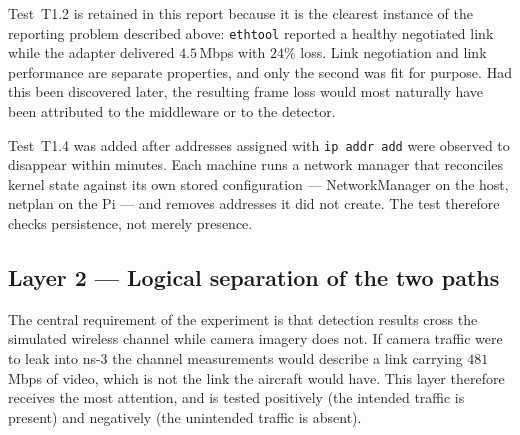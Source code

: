Test~T1.2 is retained in this report because it is the clearest instance of
the reporting problem described above: \texttt{ethtool} reported a healthy
negotiated link while the adapter delivered $4.5$\,Mbps with $24\%$ loss.
Link negotiation and link performance are separate properties, and only the
second was fit for purpose. Had this been discovered later, the resulting
frame loss would most naturally have been attributed to the middleware or to
the detector.

Test~T1.4 was added after addresses assigned with \texttt{ip addr add} were
observed to disappear within minutes. Each machine runs a network manager
that reconciles kernel state against its own stored configuration ---
NetworkManager on the host, netplan on the Pi --- and removes addresses it
did not create. The test therefore checks persistence, not merely presence.

\subsection{Layer 2 --- Logical separation of the two paths}
\label{sec:test-l2}

The central requirement of the experiment is that detection results cross
the simulated wireless channel while camera imagery does not. If camera
traffic were to leak into ns-3 the channel measurements would describe a
link carrying $481$\,Mbps of video, which is not the link the aircraft
would have. This layer therefore receives the most attention, and is tested
positively (the intended traffic is present) and negatively (the unintended
traffic is absent).

